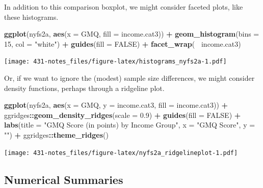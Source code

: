 \documentclass[
]{book}
\newenvironment{Shaded}{\begin{snugshade}}{\end{snugshade}}
\newcommand{\DataTypeTok}[1]{\textcolor[rgb]{0.13,0.29,0.53}{#1}}
\newcommand{\DecValTok}[1]{\textcolor[rgb]{0.00,0.00,0.81}{#1}}
\newcommand{\FloatTok}[1]{\textcolor[rgb]{0.00,0.00,0.81}{#1}}
\newcommand{\KeywordTok}[1]{\textcolor[rgb]{0.13,0.29,0.53}{\textbf{#1}}}
\newcommand{\NormalTok}[1]{#1}
\newcommand{\OperatorTok}[1]{\textcolor[rgb]{0.81,0.36,0.00}{\textbf{#1}}}
\newcommand{\OtherTok}[1]{\textcolor[rgb]{0.56,0.35,0.01}{#1}}
\newcommand{\StringTok}[1]{\textcolor[rgb]{0.31,0.60,0.02}{#1}}
\begin{document}
In addition to this comparison boxplot, we might consider faceted plots, like these histograms.

\begin{Shaded}
\begin{Highlighting}[]
\KeywordTok{ggplot}\NormalTok{(nyfs2a, }\KeywordTok{aes}\NormalTok{(}\DataTypeTok{x =}\NormalTok{ GMQ, }\DataTypeTok{fill =}\NormalTok{ income.cat3)) }\OperatorTok{+}
\StringTok{  }\KeywordTok{geom_histogram}\NormalTok{(}\DataTypeTok{bins =} \DecValTok{15}\NormalTok{, }\DataTypeTok{col =} \StringTok{"white"}\NormalTok{) }\OperatorTok{+}
\StringTok{  }\KeywordTok{guides}\NormalTok{(}\DataTypeTok{fill =} \OtherTok{FALSE}\NormalTok{) }\OperatorTok{+}
\StringTok{  }\KeywordTok{facet_wrap}\NormalTok{(}\OperatorTok{~}\StringTok{ }\NormalTok{income.cat3)}
\end{Highlighting}
\end{Shaded}

\texttt{[image: 431-notes\_files/figure-latex/histograms\_nyfs2a-1.pdf]}

Or, if we want to ignore the (modest) sample size differences, we might consider density functions, perhaps through a ridgeline plot.

\begin{Shaded}
\begin{Highlighting}[]
\KeywordTok{ggplot}\NormalTok{(nyfs2a, }\KeywordTok{aes}\NormalTok{(}\DataTypeTok{x =}\NormalTok{ GMQ, }\DataTypeTok{y =}\NormalTok{ income.cat3, }\DataTypeTok{fill =}\NormalTok{ income.cat3)) }\OperatorTok{+}
\StringTok{    }\NormalTok{ggridges}\OperatorTok{::}\KeywordTok{geom_density_ridges}\NormalTok{(}\DataTypeTok{scale =} \FloatTok{0.9}\NormalTok{) }\OperatorTok{+}
\StringTok{    }\KeywordTok{guides}\NormalTok{(}\DataTypeTok{fill =} \OtherTok{FALSE}\NormalTok{) }\OperatorTok{+}\StringTok{ }
\StringTok{    }\KeywordTok{labs}\NormalTok{(}\DataTypeTok{title =} \StringTok{"GMQ Score (in points) by Income Group"}\NormalTok{,}
         \DataTypeTok{x =} \StringTok{"GMQ Score"}\NormalTok{, }\DataTypeTok{y =} \StringTok{""}\NormalTok{) }\OperatorTok{+}
\StringTok{    }\NormalTok{ggridges}\OperatorTok{::}\KeywordTok{theme_ridges}\NormalTok{()}
\end{Highlighting}
\end{Shaded}

\texttt{[image: 431-notes\_files/figure-latex/nyfs2a\_ridgelineplot-1.pdf]}

\hypertarget{numerical-summaries}{%
\subsection{Numerical Summaries}\label{numerical-summaries}}
\end{document}
